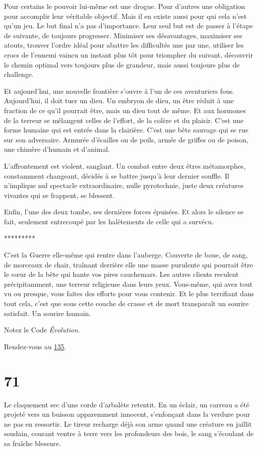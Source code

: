 \documentclass{report}
\newcommand{\gsection}[1]{
    \section{#1}
    \label{section-#1}
}
\newcommand{\glink}[1]{\hyperref[section-#1]{#1}}
\newcommand{\ellipse}{
    \begin{center}
        *********
    \end{center}
}
\begin{document}
Pour certains le pouvoir lui-même est une drogue. Pour d'autres une obligation pour accomplir leur véritable objectif. Mais il en existe aussi pour qui cela n'est qu'un jeu. Le but final n'a pas d'importance. Leur seul but est de passer à l'étape de suivante, de toujours progresser. Minimiser ses désavantages, maximiser ses atouts, trouver l'ordre idéal pour abattre les difficultés une par une, utiliser les crocs de l'ennemi vaincu un instant plus tôt pour triompher du suivant, découvrir le chemin optimal vers toujours plus de grandeur, mais aussi toujours plus de challenge.

Et aujourd'hui, une nouvelle frontière s'ouvre à l'un de ces aventuriers fous. Aujourd'hui, il doit tuer un dieu. Un embryon de dieu, un être réduit à une fraction de ce qu'il pourrait être, mais un dieu tout de même. Et aux hormones de la terreur se mélangent celles de l'effort, de la colère et du plaisir.
C'est une forme humaine qui est entrée dans la clairière. C'est une bête sauvage qui se rue sur son adversaire. Armurée d'écailles ou de poils, armée de griffes ou de poison, une chimère d'humain et d'animal.

L'affrontement est violent, sanglant. Un combat entre deux êtres métamorphes, constamment changeant, décidés à se battre jusqu'à leur dernier souffle. Il n'implique nul spectacle extraordinaire, nulle pyrotechnie, juste deux créatures vivantes qui se frappent, se blessent.

Enfin, l'une des deux tombe, ses dernières forces épuisées. Et alors le silence se fait, seulement entrecoupé par les halètements de celle qui a survécu.

\ellipse

C'est la Guerre elle-même qui rentre dans l'auberge. Couverte de boue, de sang, de morceaux de chair, traînant derrière elle une masse purulente qui pourrait être le cœur de la bête qui hante vos pires cauchemars. Les autres clients reculent précipitamment, une terreur religieuse dans leurs yeux. Vous-même, qui avez tout vu ou presque, vous faites des efforts pour vous contenir. Et le plus terrifiant dans tout cela, c'est que sous cette couche de crasse et de mort transparaît un sourire satisfait. Un sourire humain.

Notez le Code \emph{Évolution}.

Rendez-vous au \glink{135}.

\gsection{71}

Le claquement sec d'une corde d'arbalète retentit. En un éclair, un carreau a été projeté vers un buisson apparemment innocent, s'enfonçant dans la verdure pour ne pas en ressortir. Le tireur recharge déjà son arme quand une créature en jaillit soudain, courant ventre à terre vers les profondeurs des bois, le sang s'écoulant de sa fraîche blessure.
\end{document}
